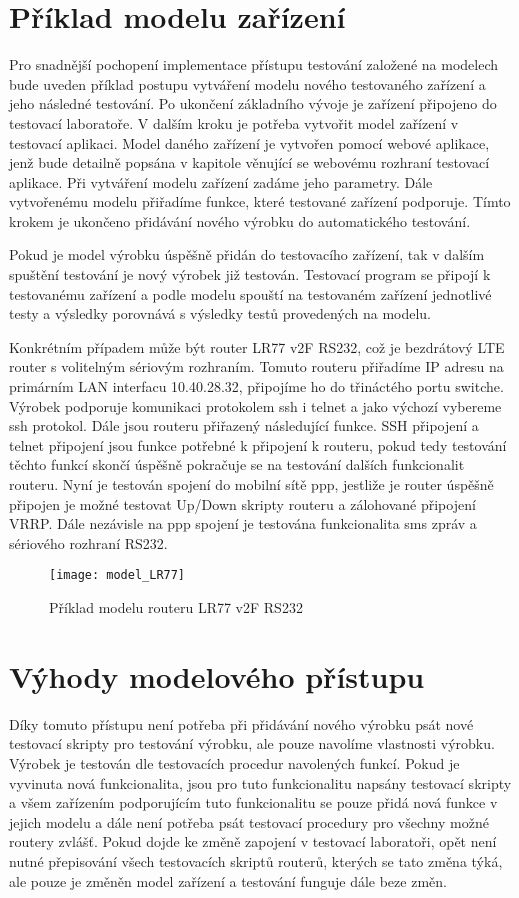\section{Příklad modelu zařízení}
Pro snadnější pochopení implementace přístupu testování založené na modelech bude uveden příklad postupu vytváření modelu nového testovaného zařízení a jeho následné testování. Po ukončení základního vývoje je zařízení připojeno do testovací laboratoře. V dalším kroku je potřeba vytvořit model zařízení v testovací aplikaci. Model daného zařízení je vytvořen pomocí webové aplikace, jenž bude detailně popsána v kapitole věnující se webovému rozhraní testovací aplikace. Při vytváření modelu zařízení zadáme jeho parametry. Dále vytvořenému modelu přiřadíme funkce, které testované zařízení podporuje. Tímto krokem je ukončeno přidávání nového výrobku do automatického testování.

Pokud je model výrobku úspěšně přidán do testovacího zařízení, tak v dalším spuštění testování je nový výrobek již testován. Testovací program se připojí k testovanému zařízení a podle modelu spouští na testovaném zařízení jednotlivé testy a výsledky porovnává s výsledky testů provedených na modelu.

Konkrétním případem může být router LR77 v2F RS232, což je bezdrátový LTE router s volitelným sériovým rozhraním. Tomuto routeru přiřadíme IP adresu na primárním LAN interfacu 10.40.28.32, připojíme ho do třináctého portu switche. Výrobek podporuje komunikaci protokolem ssh i telnet a jako výchozí vybereme ssh protokol. Dále jsou  routeru přiřazený následující funkce. SSH připojení a telnet připojení jsou funkce potřebné k připojení k routeru, pokud tedy testování těchto funkcí skončí úspěšně pokračuje se na testování dalších funkcionalit routeru. Nyní je testován spojení do mobilní sítě ppp, jestliže je router úspěšně připojen je možné testovat Up/Down skripty routeru a zálohované připojení VRRP. Dále nezávisle na ppp spojení je testována funkcionalita sms zpráv a sériového rozhraní RS232.

\begin{figure}[h]
  \centering
  \texttt{[image: model\_LR77]}
  \caption{Příklad modelu routeru LR77 v2F RS232}
  \label{fig:model_LR77}
\end{figure}

\section{Výhody modelového přístupu}
Díky tomuto přístupu není potřeba při přidávání nového výrobku psát nové testovací skripty pro testování výrobku, ale pouze navolíme vlastnosti výrobku. Výrobek je testován dle testovacích procedur navolených funkcí. Pokud je vyvinuta nová funkcionalita, jsou pro tuto funkcionalitu napsány testovací skripty a všem zařízením podporujícím tuto funkcionalitu se pouze přidá nová funkce v jejich modelu a dále není potřeba psát testovací procedury pro všechny možné routery zvlášť. Pokud dojde ke změně zapojení v testovací laboratoři, opět není nutné přepisování všech testovacích skriptů routerů, kterých se tato změna týká, ale pouze je změněn model zařízení a testování funguje dále beze změn.

\endinput
